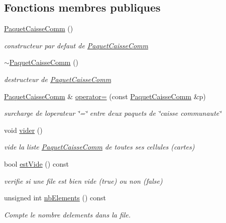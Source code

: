 \subsection*{Fonctions membres publiques}
\begin{DoxyCompactItemize}
\item 
\hyperlink{classPaquetCaisseComm_aa01ac60f4e3e0ba2ec02402d86432bd8}{Paquet\+Caisse\+Comm} ()
\begin{DoxyCompactList}\small\item\em constructeur par defaut de \hyperlink{classPaquetCaisseComm}{Paquet\+Caisse\+Comm} \end{DoxyCompactList}\item 
\hyperlink{classPaquetCaisseComm_a9ea6dccf1093cdb5807c996745a8ce68}{$\sim$\+Paquet\+Caisse\+Comm} ()
\begin{DoxyCompactList}\small\item\em destructeur de \hyperlink{classPaquetCaisseComm}{Paquet\+Caisse\+Comm} \end{DoxyCompactList}\item 
\hyperlink{classPaquetCaisseComm}{Paquet\+Caisse\+Comm} \& \hyperlink{classPaquetCaisseComm_aca9657c21e06fff1f0ffa3a1030cec27}{operator=} (const \hyperlink{classPaquetCaisseComm}{Paquet\+Caisse\+Comm} \&p)
\begin{DoxyCompactList}\small\item\em surcharge de l\textquotesingle{}operateur \char`\"{}=\char`\"{} entre deux paquets de \char`\"{}caisse communaute\char`\"{} \end{DoxyCompactList}\item 
void \hyperlink{classPaquetCaisseComm_a41f3a14b45c12fa770774c2871a1e257}{vider} ()
\begin{DoxyCompactList}\small\item\em vide la liste \hyperlink{classPaquetCaisseComm}{Paquet\+Caisse\+Comm} de toutes ses cellules (cartes) \end{DoxyCompactList}\item 
bool \hyperlink{classPaquetCaisseComm_a82100c34993a74ad83876a81d8cbd722}{est\+Vide} () const 
\begin{DoxyCompactList}\small\item\em verifie si une file est bien vide (true) ou non (false) \end{DoxyCompactList}\item 
unsigned int \hyperlink{classPaquetCaisseComm_a0ccefaf67a8186a9ff5960eb5b408b22}{nb\+Elements} () const 
\begin{DoxyCompactList}\small\item\em Compte le nombre d\textquotesingle{}elements dans la file. \end{DoxyCompactList}\item 

\end{DoxyCompactItemize}
